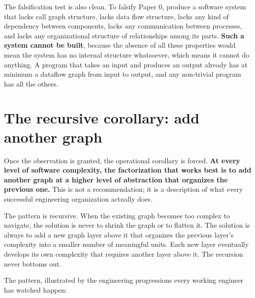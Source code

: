 \documentclass[11pt]{article}
\begin{document}
The falsification test is also clean. To falsify Paper 0, produce a software system that lacks call graph structure, lacks data flow structure, lacks any kind of dependency between components, lacks any communication between processes, and lacks any organizational structure of relationships among its parts. \textbf{Such a system cannot be built}, because the absence of all these properties would mean the system has no internal structure whatsoever, which means it cannot do anything. A program that takes an input and produces an output already has at minimum a dataflow graph from input to output, and any non-trivial program has all the others.

\section{The recursive corollary: add another graph}
\label{sec:recursive}

Once the observation is granted, the operational corollary is forced. \textbf{At every level of software complexity, the factorization that works best is to add another graph at a higher level of abstraction that organizes the previous one.} This is not a recommendation; it is a description of what every successful engineering organization actually does.

The pattern is recursive. When the existing graph becomes too complex to navigate, the solution is never to shrink the graph or to flatten it. The solution is always to add a new graph layer above it that organizes the previous layer's complexity into a smaller number of meaningful units. Each new layer eventually develops its own complexity that requires another layer above it. The recursion never bottoms out.

The pattern, illustrated by the engineering progressions every working engineer has watched happen:
\end{document}
